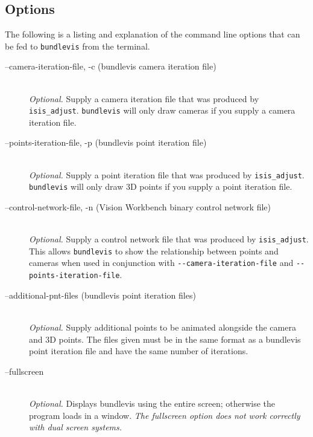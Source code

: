 \subsection{Options}

The following is a listing and explanation of the command line options
that can be fed to \texttt{bundlevis} from the terminal.

\begin{description}

\item[--camera-iteration-file, -c \textnormal{\small{(bundlevis camera iteration file)}}] \hfill \\

  \emph{Optional.} Supply a camera iteration file that was produced by
       {\tt isis\_adjust}.  \texttt{bundlevis} will only draw cameras
       if you supply a camera iteration file.

\item[--points-iteration-file, -p \textnormal{\small{(bundlevis point iteration file)}}] \hfill \\

  \emph{Optional.} Supply a point iteration file that was produced by
       {\tt isis\_adjust}.  \texttt{bundlevis} will only draw 3D points
       if you supply a point iteration file.

\item[--control-network-file, -n \textnormal{\small{(Vision Workbench binary control network file)}}] \hfill \\

  \emph{Optional.} Supply a control network file that was produced by
       {\tt isis\_adjust}.  This allows {\tt bundlevis} to show the
       relationship between points and cameras when used in
       conjunction with \verb=--camera-iteration-file= and
       \verb=--points-iteration-file=.

\item[--additional-pnt-files \textnormal{\small{(bundlevis point iteration files)}}] \hfill \\

  \emph{Optional.} Supply additional points to be animated alongside
  the camera and 3D points.  The files given must be in the same
  format as a bundlevis point iteration file and have the same number
  of iterations.

\item[--fullscreen] \hfill \\

  \emph{Optional.} Displays bundlevis using the entire screen;
  otherwise the program loads in a window. \emph{The fullscreen option
    does not work correctly with dual screen systems.}


\end{description}
